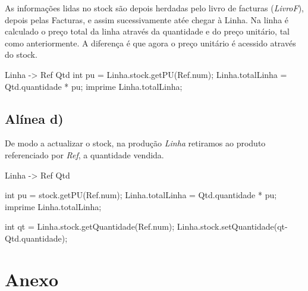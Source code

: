 \documentclass[11pt,a4paper]{article}
\begin{document}
As informações lidas no stock são depois herdadas pelo livro de facturas (\textit{LivroF}), depois pelas Facturas, e assim sucessivamente atée chegar à Linha.
Na linha é calculado o preço total da linha através da quantidade e do preço unitário, tal como anteriormente. A diferença é que agora o preço unitário é acessido através do stock.

\begin{code_txt} 
Linha -> Ref Qtd {  
	int pu = Linha.stock.getPU(Ref.num);
	Linha.totalLinha = Qtd.quantidade * pu;
	imprime Linha.totalLinha;
}
\end{code_txt} 


\subsection{Alínea d)}
De modo a actualizar o stock, na produção \textit{Linha} retiramos ao produto referenciado por \textit{Ref}, a quantidade vendida.

\begin{code_txt} 
Linha -> Ref Qtd {  
		int pu = stock.getPU(Ref.num);
 		Linha.totalLinha = Qtd.quantidade * pu;
		imprime Linha.totalLinha;
		
		int qt = Linha.stock.getQuantidade(Ref.num);
		Linha.stock.setQuantidade(qt-Qtd.quantidade);	
		}
\end{code_txt} 

\newpage

\section{Anexo}
\end{document}
